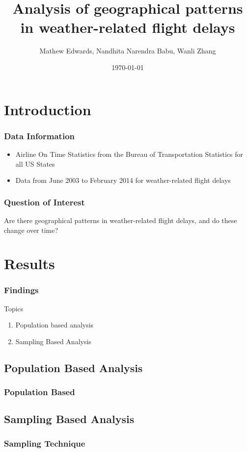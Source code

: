 \documentclass{beamer}
\title{Analysis of  geographical patterns in weather-related flight delays}
\author{Mathew Edwards, Nandhita Narendra Babu, Wanli Zhang}
\date{\today}
\begin{document}
\begin{frame}
\titlepage
\end{frame}

\begin{frame}{\contentsname}
\tableofcontents
\end{frame}

\section{Introduction}

\begin{frame}
\frametitle{Data Information}
\begin{itemize}
\item Airline On Time Statistics from the Bureau of Transportation Statistics for all US States
\item Data from June 2003 to February 2014 for weather-related flight delays
\end{itemize}
\end{frame}

\begin{frame}
\frametitle{Question of Interest}
Are there geographical patterns in weather-related flight delays, and do these change over time?
\end{frame}

\section{Results}
\begin{frame}
\frametitle{Findings}
Topics 
\begin{enumerate}
\item Population based analysis 
\item Sampling Based Analysis
\end{enumerate}
\end{frame}

\subsection{Population Based Analysis}
\begin{frame}
\frametitle{Population Based}
\begin{center} 

\end{center}
\end{frame}

\subsection{Sampling Based Analysis}
\begin{frame}
\frametitle{Sampling Technique}
\begin{center} 
\end{center}
\end{frame}
\end{document}

